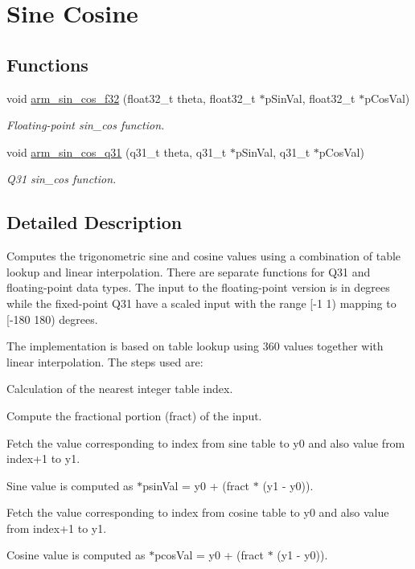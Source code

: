 \hypertarget{group___sin_cos}{\section{Sine Cosine}
\label{group___sin_cos}
}
\subsection*{Functions}
\begin{DoxyCompactItemize}
\item 
void \hyperlink{group___sin_cos_ga4420d45c37d58c310ef9ae1b5fe58020}{arm\-\_\-sin\-\_\-cos\-\_\-f32} (float32\-\_\-t theta, float32\-\_\-t $\ast$p\-Sin\-Val, float32\-\_\-t $\ast$p\-Cos\-Val)
\begin{DoxyCompactList}\small\item\em Floating-\/point sin\-\_\-cos function. \end{DoxyCompactList}\item 
void \hyperlink{group___sin_cos_gae9e4ddebff9d4eb5d0a093e28e0bc504}{arm\-\_\-sin\-\_\-cos\-\_\-q31} (q31\-\_\-t theta, q31\-\_\-t $\ast$p\-Sin\-Val, q31\-\_\-t $\ast$p\-Cos\-Val)
\begin{DoxyCompactList}\small\item\em Q31 sin\-\_\-cos function. \end{DoxyCompactList}\end{DoxyCompactItemize}


\subsection{Detailed Description}
Computes the trigonometric sine and cosine values using a combination of table lookup and linear interpolation. There are separate functions for Q31 and floating-\/point data types. The input to the floating-\/point version is in degrees while the fixed-\/point Q31 have a scaled input with the range \mbox{[}-\/1 1) mapping to \mbox{[}-\/180 180) degrees.

The implementation is based on table lookup using 360 values together with linear interpolation. The steps used are\-:
\begin{DoxyEnumerate}
\item Calculation of the nearest integer table index.
\item Compute the fractional portion (fract) of the input.
\item Fetch the value corresponding to {\ttfamily index} from sine table to {\ttfamily y0} and also value from {\ttfamily index+1} to {\ttfamily y1}.
\item Sine value is computed as {\ttfamily  $\ast$psin\-Val = y0 + (fract $\ast$ (y1 -\/ y0))}.
\item Fetch the value corresponding to {\ttfamily index} from cosine table to {\ttfamily y0} and also value from {\ttfamily index+1} to {\ttfamily y1}.
\item Cosine value is computed as {\ttfamily  $\ast$pcos\-Val = y0 + (fract $\ast$ (y1 -\/ y0))}. 
\end{DoxyEnumerate}

